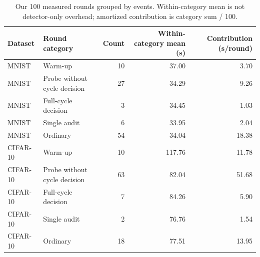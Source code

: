 \begin{table}[t]\centering\footnotesize
\caption{Our 100 measured rounds grouped by events. Within-category mean is not detector-only overhead; amortized contribution is category sum / 100.}\label{tab:timing-phases}
\begin{tabular}{llrrr}\toprule Dataset & Round category & Count & Within-category mean (s) & Contribution (s/round) \\ \midrule
MNIST & Warm-up & 10 & 37.00 & 3.70 \\
MNIST & Probe without cycle decision & 27 & 34.29 & 9.26 \\
MNIST & Full-cycle decision & 3 & 34.45 & 1.03 \\
MNIST & Single audit & 6 & 33.95 & 2.04 \\
MNIST & Ordinary & 54 & 34.04 & 18.38 \\
CIFAR-10 & Warm-up & 10 & 117.76 & 11.78 \\
CIFAR-10 & Probe without cycle decision & 63 & 82.04 & 51.68 \\
CIFAR-10 & Full-cycle decision & 7 & 84.26 & 5.90 \\
CIFAR-10 & Single audit & 2 & 76.76 & 1.54 \\
CIFAR-10 & Ordinary & 18 & 77.51 & 13.95 \\
\bottomrule\end{tabular}\end{table}
